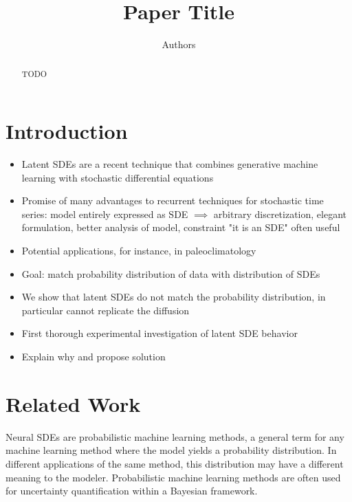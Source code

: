 \documentclass[twoside,11pt]{article}
\begin{document}
\title{Paper Title}

\author{Authors}


\maketitle

\begin{abstract}%
TODO
\end{abstract}

\begin{keywords}
\end{keywords}

\section{Introduction}

\begin{itemize}
    \item Latent SDEs are a recent technique that combines generative machine learning with stochastic differential equations
    \item Promise of many advantages to recurrent techniques for stochastic time series: model entirely expressed as SDE \(\implies\) arbitrary discretization, elegant formulation, better analysis of model, constraint "it is an SDE" often useful
    \item Potential applications, for instance, in paleoclimatology
    \item Goal: match probability distribution of data with distribution of SDEs
    \item We show that latent SDEs do not match the probability distribution, in particular cannot replicate the diffusion
    \item First thorough experimental investigation of latent SDE behavior
    \item Explain why and propose solution
\end{itemize}

\section{Related Work}
Neural SDEs are probabilistic machine learning methods, a general term for any machine learning method where the model yields a probability distribution. In different applications of the same method, this distribution may have a different meaning to the modeler. Probabilistic machine learning methods are often used for uncertainty quantification within a Bayesian framework.
\end{document}
